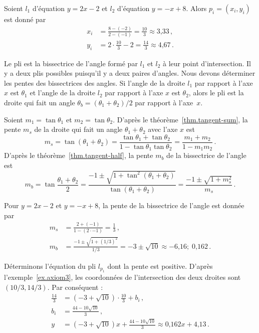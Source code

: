 \begin{example}\label{ex.axiom3}
Soient $l_1$ d'équation $y=2x-2$ et $l_2$ d'équation $y=-x+8$. Alors $p_i=(x_i,y_i)$ est donné par
\begin{align*}
x_i&=\frac{8-(-2)}{2-(-1)}=\frac{10}{3}\approx \mbox{3,33}\,,\\
y_i &= 2\cdot\frac{10}{3}-2=\frac{14}{3}\approx \mbox{4,67}\,.
\end{align*}
\end{example}


Le pli est la bissectrice de l'angle formé par $l_1$ et $l_2$ à leur point d'intersection. Il y a deux plis possibles puisqu'il y a deux paires d'angles. Nous devons déterminer les pentes des bissectrices des angles. Si l'angle de la droite $l_1$ par rapport à l'axe $x$ est $\theta_1$ et l'angle de la droite $l_2$ par rapport à l'axe $x$ est $\theta_2$, alors le pli est la droite qui fait un angle  $\theta_b=(\theta_1+\theta_2)/2$ par rapport à l'axe~$x$.

Soient $m_1=\tan\theta_1$ et $m_2=\tan \theta_2$. D'après le théorème~\ref{thm.tangent-sum},  la pente $m_s$ de la droite qui fait un angle  $\theta_1+\theta_2$ avec l'axe $x$ est 
\[
m_s=\tan(\theta_1+\theta_2)= \frac{\tan\theta_1+\tan\theta_2}{1-\tan\theta_1\tan\theta_2}=\frac{m_1+m_2}{1-m_1m_2}\,.
\]
D'après le théorème~\ref{thm.tangent-half},  la pente $m_b$ de la bissectrice de l'angle est 
\[
m_b= \tan\frac{\theta_1+\theta_2}{2}=\frac{-1\pm\sqrt{1+\tan^2(\theta_1+\theta_2)}}{\tan (\theta_1+\theta_2)}=\frac{-1\pm\sqrt{1+m_s^2}}{m_s}\,.
\]
\begin{example}
Pour $y=2x-2$ et $y=-x+8$, la pente de la bissectrice de l'angle est donnée par
%
\begin{align*}
m_s&=\frac{2+(-1)}{1-(2 \cdot -1)}=\frac{1}{3}\,,\\
m_b&=\frac{-1\pm\sqrt{1+(1/3)^2}}{1/3}=-3\pm \sqrt{10}\approx -\mbox{6,16};\; \mbox{0,162}\,.
\end{align*}
\end{example}

Déterminons l'équation du pli $l_{p_1}$ dont la pente est positive. D'après l'exemple~\ref{ex.axiom3}, les coordonnées de l'intersection des deux droites sont $(10/3, 14/3)$. Par conséquent :
\begin{align*}
\frac{14}{3} &= (-3+\sqrt{10}) \cdot \frac{10}{3} + b_i\,,\\ b_i&=\frac{44-10\sqrt{10}}{3}\,,\\
y&= (-3+\sqrt{10})x + \frac{44-10\sqrt{10}}{3}\approx \mbox{0,162}x+\mbox{4,13}\,.
\end{align*}

